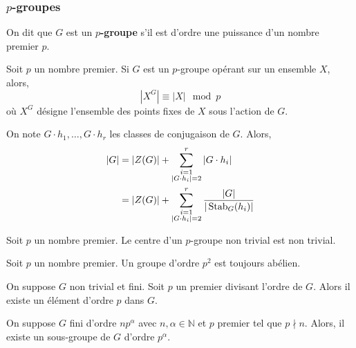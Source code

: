   \subsubsection{\texorpdfstring{$p$}{p}-groupes}
  
  
  \begin{definition}
    On dit que $G$ est un \textbf{$p$-groupe} s'il est d'ordre une puissance d'un nombre premier $p$.
  \end{definition}
  
  \begin{proposition}
    Soit $p$ un nombre premier. Si $G$ est un $p$-groupe opérant sur un ensemble $X$, alors,
    \[ |X^G| \equiv |X| \mod p \]
    où $X^G$ désigne l'ensemble des points fixes de $X$ sous l'action de $G$.
  \end{proposition}
  
  \begin{corollary}
    On note $G \cdot h_1, \dots, G \cdot h_r$ les classes de conjugaison de $G$. Alors,
    \begin{align*}
      \vert G \vert &= \vert Z(G) \vert + \sum_{\substack{i=1 \\ \vert G \cdot h_i \vert = 2}}^{r} \vert G \cdot h_i \vert \\
      &= \vert Z(G) \vert + \sum_{\substack{i=1 \\ \vert G \cdot h_i \vert = 2}}^{r} \frac{\vert G \vert}{\vert \operatorname{Stab}_G(h_i) \vert}
    \end{align*}
  \end{corollary}
  
  \begin{corollary}
    Soit $p$ un nombre premier. Le centre d'un $p$-groupe non trivial est non trivial.
  \end{corollary}
  
  \begin{corollary}
    Soit $p$ un nombre premier. Un groupe d'ordre $p^2$ est toujours abélien.
  \end{corollary}
  
  \begin{application}
    On suppose $G$ non trivial et fini. Soit $p$ un premier divisant l'ordre de $G$. Alors il existe un élément d'ordre $p$ dans $G$.
  \end{application}
  
  
  \begin{application}
    On suppose $G$ fini d'ordre $n p^\alpha$ avec $n, \alpha \in \mathbb{N}$ et $p$ premier tel que $p \nmid n$. Alors, il existe un sous-groupe de $G$ d’ordre $p^\alpha$.
  \end{application}
  
